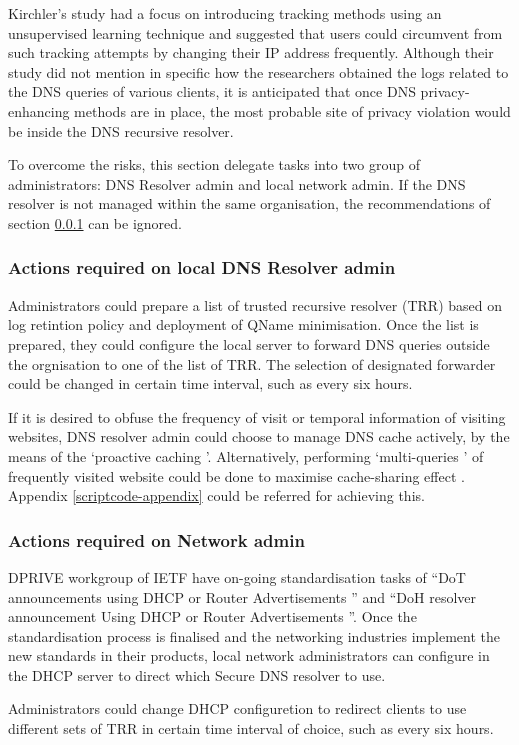 Kirchler's study had a focus on introducing tracking methods using an unsupervised learning technique and suggested that users could circumvent from such tracking attempts by changing their IP address frequently.
Although their study did not mention in specific how the researchers obtained the logs related to the DNS queries of various clients, it is anticipated that once DNS privacy-enhancing methods are in place, the most probable site of privacy violation would be inside the DNS recursive resolver.

To overcome the risks, this section delegate tasks into two group of administrators: DNS Resolver admin and local network admin.
If the DNS resolver is not managed within the same organisation, the recommendations of section \ref{dnsresolveradmin} can be ignored.

\subsubsection{Actions required on local DNS Resolver admin}\label{dnsresolveradmin}
Administrators could prepare a list of trusted recursive resolver (TRR) based on log retintion policy and deployment of QName minimisation.
Once the list is prepared, they could configure the local server to forward DNS queries outside the orgnisation to one of the list of TRR.
The selection of designated forwarder could be changed in certain time interval, such as every six hours.

If it is desired to obfuse the frequency of visit or temporal information of visiting websites, DNS resolver admin could choose to manage DNS cache actively, by the means of the `proactive caching \cite{cohen2003proactive}'. Alternatively, performing `multi-queries \cite{siby2018dns}' of frequently visited website could be done to maximise cache-sharing effect \cite{wang2013analysis}. Appendix \ref{scriptcode-appendix} could be referred for achieving this.

\subsubsection{Actions required on Network admin}
DPRIVE workgroup of IETF have on-going standardisation tasks of ``DoT announcements using DHCP or Router Advertisements \cite{peterson-dot-dhcp-00}'' and ``DoH resolver announcement Using DHCP or Router Advertisements \cite{peterson-doh-dhcp-00}''.
Once the standardisation process is finalised and the networking industries implement the new standards in their products, local network administrators can configure in the DHCP server to direct which Secure DNS resolver to use.

Administrators could change DHCP configuretion to redirect clients to use different sets of TRR in certain time interval of choice, such as every six hours.